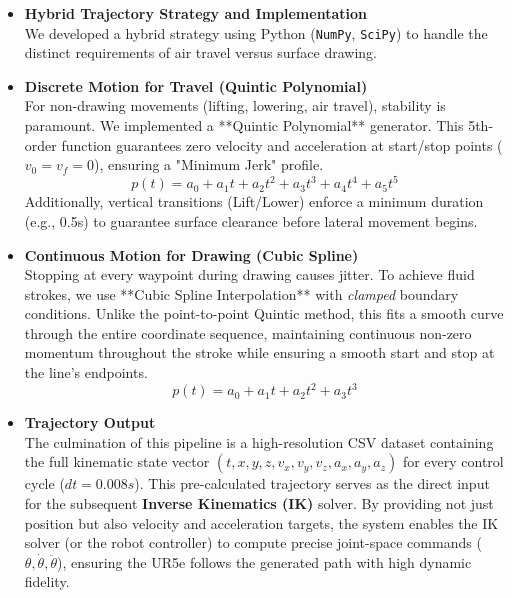 \begin{itemize}
    \item \textbf{Hybrid Trajectory Strategy and Implementation}\\
    We developed a hybrid strategy using Python (\texttt{NumPy}, \texttt{SciPy}) to handle the distinct requirements of air travel versus surface drawing.

    \item \textbf{Discrete Motion for Travel (Quintic Polynomial)}\\
    For non-drawing movements (lifting, lowering, air travel), stability is paramount. We implemented a **Quintic Polynomial** generator. This 5th-order function guarantees zero velocity and acceleration at start/stop points ($v_0=v_f=0$), ensuring a "Minimum Jerk" profile.
    \begin{equation}
        p(t) = a_0 + a_1 t + a_2 t^2 + a_3 t^3 + a_4 t^4 + a_5 t^5
    \end{equation}
    Additionally, vertical transitions (Lift/Lower) enforce a minimum duration (e.g., 0.5s) to guarantee surface clearance before lateral movement begins.

    \item\textbf{Continuous Motion for Drawing (Cubic Spline)}\\
    Stopping at every waypoint during drawing causes jitter. To achieve fluid strokes, we use **Cubic Spline Interpolation** with \textit{clamped} boundary conditions. Unlike the point-to-point Quintic method, this fits a smooth curve through the entire coordinate sequence, maintaining continuous non-zero momentum throughout the stroke while ensuring a smooth start and stop at the line's endpoints.
    \begin{equation}
        p(t) = a_0 + a_1 t + a_2 t^2 + a_3 t^3
    \end{equation}

    \item\textbf{Trajectory Output}\\
    The culmination of this pipeline is a high-resolution CSV dataset containing the full kinematic state vector $(t, x, y, z, v_x, v_y, v_z, a_x, a_y, a_z)$ for every control cycle ($dt=0.008s$). This pre-calculated trajectory serves as the direct input for the subsequent \textbf{Inverse Kinematics (IK)} solver. By providing not just position but also velocity and acceleration targets, the system enables the IK solver (or the robot controller) to compute precise joint-space commands ($\theta, \dot{\theta}, \ddot{\theta}$), ensuring the UR5e follows the generated path with high dynamic fidelity.
\end{itemize}
